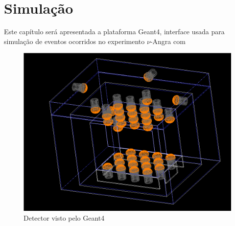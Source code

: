 \chapter{Simulação} \label{cap:simulacao}
\vspace{-2cm}

Este capítulo será apresentada a plataforma Geant4, interface usada para simulação de eventos ocorridos no experimento $\nu$-Angra com 

\begin{figure}
    \centering
    \includegraphics[width=16cm]{textuais/simulacao/figuras/sim_det.png}
    \caption{Detector visto pelo Geant4}
    \label{fig:simdetector}
\end{figure}